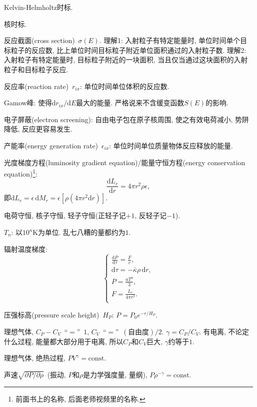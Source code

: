 Kelvin-Helmholtz时标.

核时标.

反应截面(cross section)~$\sigma(E)$. 理解1: 入射粒子有特定能量时, 单位时间单个目标粒子的反应数, 比上单位时间目标粒子附近单位面积通过的入射粒子数. 理解2: 入射粒子有特定能量时, 目标粒子附近的一块面积, 当且仅当通过这块面积的入射粒子和目标粒子反应.

反应率(reaction rate)~$r_{ix}$: 单位时间单位体积的反应数.

Gamow峰: 使得$\mathrm{d}r_{ix}/\mathrm{d}E$最大的能量. 严格说来不含缓变函数$S(E)$的影响.

电子屏蔽(electron screening): 自由电子包在原子核周围, 使之有效电荷减小, 势阱降低, 反应更容易发生.

产能率(energy generation rate)~$\epsilon_{ix}$: 单位时间单位质量物体反应释放的能量.

光度梯度方程(luminosity gradient equation)/能量守恒方程(energy conservation equation)\footnote{前面书上的名称, 后面老师视频里的名称.}:
\begin{equation*}
    \frac{\mathrm{d} L_r}{\mathrm{d} r}
    = 4\pi r^2\rho\epsilon,
\end{equation*}
即$\mathrm{d} L_r = \epsilon\,\mathrm{d} M_r= \epsilon[\rho(4\pi r^2\mathrm{d} r)]$.

电荷守恒, 核子守恒, 轻子守恒(正轻子记$+1$, 反轻子记$-1$).

$T_n$: 以$10^n\text{K}$为单位. 乱七八糟的量都约为$1$.

辐射温度梯度:
\begin{equation*}
    \begin{cases}
        \frac{\mathrm{d}P}{\mathrm{d}\tau}=\frac{F}{c}, \\
        \mathrm{d}\tau = -\bar{\kappa}\rho\,\mathrm{d}r, \\
         P=\frac{aT^4}{3}, \\
         F=\frac{L_r}{4\pi r^2}. \\
    \end{cases}
\end{equation*}

压强标高(pressure scale height)~$H_P$: $P=P_0e^{-r/H_P}$.

理想气体, $C_P-C_V$~``$=$''~$1$, $C_V$~``$=$''~$(\text{自由度})/2$. $\gamma=C_P/C_V$. 有电离, 不论定什么过程, 能量都大部分用于电离, 所以$C_P$和$C_V$巨大, $\gamma$约等于$1$.

理想气体, 绝热过程, $PV^\gamma=\text{const}$.

声速$\sqrt{\partial P/\partial \rho}$~(振动, $P$和$\rho$是力学强度量, 量纲), $P
\rho^{-\gamma}=\text{const}$.

